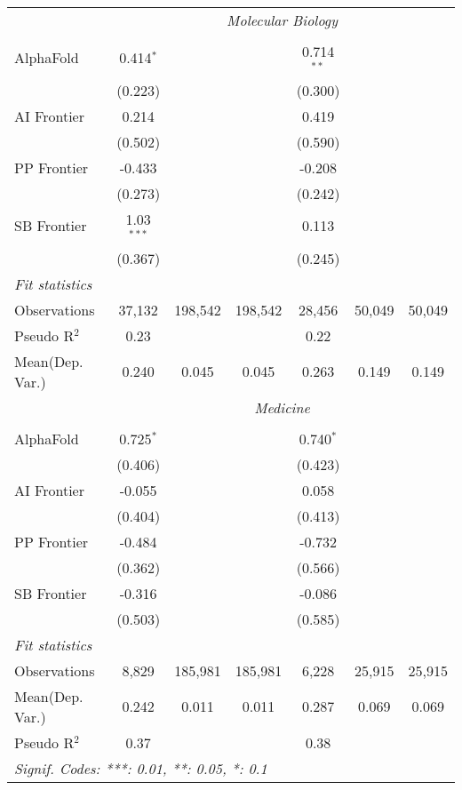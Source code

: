 \begin{tabular}{lcccccc}
 & \multicolumn{6}{c}{\textit{Molecular Biology}} \\ \\
   AlphaFold    & 0.414$^{*}$  &         &         & 0.714$^{**}$ &        &   \\   
                & (0.223)      &         &         & (0.300)      &        &   \\   
   AI Frontier  & 0.214        &         &         & 0.419        &        &   \\   
                & (0.502)      &         &         & (0.590)      &        &   \\   
   PP Frontier  & -0.433       &         &         & -0.208       &        &   \\   
                & (0.273)      &         &         & (0.242)      &        &   \\   
   SB Frontier  & 1.03$^{***}$ &         &         & 0.113        &        &   \\   
                & (0.367)      &         &         & (0.245)      &        &   \\   
   \midrule
   \emph{Fit statistics}\\
   Observations & 37,132       & 198,542 & 198,542 & 28,456       & 50,049 & 50,049\\  
   Pseudo R$^2$ & 0.23         &         &         & 0.22         &        & \\  
   
Mean(Dep. Var.) & 0.240 & 0.045 & 0.045 & 0.263 & 0.149 & 0.149 \\
 & \multicolumn{6}{c}{\textit{Medicine}} \\ \\
   AlphaFold    & 0.725$^{*}$ &         &         & 0.740$^{*}$ &        &   \\   
                & (0.406)     &         &         & (0.423)     &        &   \\   
   AI Frontier  & -0.055      &         &         & 0.058       &        &   \\   
                & (0.404)     &         &         & (0.413)     &        &   \\   
   PP Frontier  & -0.484      &         &         & -0.732      &        &   \\   
                & (0.362)     &         &         & (0.566)     &        &   \\   
   SB Frontier  & -0.316      &         &         & -0.086      &        &   \\   
                & (0.503)     &         &         & (0.585)     &        &   \\   
   \midrule
   \emph{Fit statistics}\\
   Observations & 8,829       & 185,981 & 185,981 & 6,228       & 25,915 & 25,915\\  
Mean(Dep. Var.) & 0.242 & 0.011 & 0.011 & 0.287 & 0.069 & 0.069 \\
   Pseudo R$^2$ & 0.37        &         &         & 0.38        &        & \\  
   \midrule \midrule
   \multicolumn{7}{l}{\emph{Signif. Codes: ***: 0.01, **: 0.05, *: 0.1}}\\
\end{tabular}
\par\endgroup
